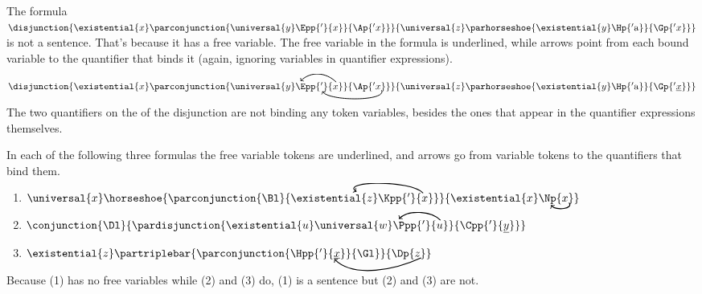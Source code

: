 \begin{majorILnc}{}
The formula $\disjunction{\existential{\variable{x}}\parconjunction{\universal{y}\Epp{'}{\variable{x}}}{\Ap{'\variable{x}}}}{\universal{\variable{z}}\parhorseshoe{\existential{\variable{y}}\Hp{'\constant{a}}}{\Gp{'\variable{x}}}}$ is not a sentence.
That's because it has a free variable. 
The free variable in the formula is underlined, while arrows point from each bound variable to the quantifier that binds it (again, ignoring variables in quantifier expressions). 

\smallskip
\begin{cenumerate}
\item $\disjunction{\existential{\variable{x}}\parconjunction{\universal{y}\Epp{'}{\variable{x}\NextLineRefC[black, distance=15, out=135, in=45]}}{\Ap{'\variable{x}}\NextLineRefH[black, distance=13, out=295, in=305]}}{\universal{\variable{z}}\parhorseshoe{\existential{\variable{y}}\Hp{'\constant{a}}}{\Gp{'\underline{\variable{x}}}}}$
\end{cenumerate}

\medskip
\noindent{}The two quantifiers on the  of the disjunction are not binding any token variables, besides the ones that appear in the quantifier expressions themselves.
\end{majorILnc}
\begin{majorILnc}{}
In each of the following three formulas the free variable tokens are underlined, and arrows go from variable tokens to the quantifiers that bind them.

\smallskip
\begin{enumerate}[label=(\arabic*), leftmargin=1.85\parindent,
labelindent=.35\parindent, labelsep=*, itemsep=8pt]
\item $\universal{\variable{x}}\horseshoe{\parconjunction{\Bl}{\existential{\variable{z}}\Kpp{'}{\variable{x}\NextLineRefF[black, distance=17, out=135, in=145]}}}{\existential{\variable{x}}\Np{\variable{x}}\NextLineRefK[black, out=-50, in=-50]}$
\item $\conjunction{\Dl}{\pardisjunction{\existential{\variable{u}}\universal{\variable{w}}\Ppp{'}{\variable{u}\NextLineRefC[black, distance=12, out=135, in=45]}}{\Cpp{'}{\underline{\variable{y}}}}}$
\item $\existential{\variable{z}}\partriplebar{\parconjunction{\Hpp{'}{\underline{\variable{x}}}}{\Gl}}{\Dp{\variable{z}}\NextLineRefI[black, distance=25, out=205, in=315]}$
\end{enumerate}

\medskip
\noindent{}Because (1) has no free variables while (2) and (3) do, (1) is a sentence but (2) and (3) are not. 
\end{majorILnc}

